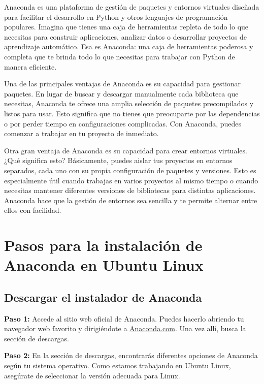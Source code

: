 \documentclass[
  a4paper,
]{article}
\begin{document}
Anaconda es una plataforma de gestión de paquetes y entornos virtuales
diseñada para facilitar el desarrollo en Python y otros lenguajes de
programación populares. Imagina que tienes una caja de herramientas
repleta de todo lo que necesitas para construir aplicaciones, analizar
datos o desarrollar proyectos de aprendizaje automático. Esa es
Anaconda: una caja de herramientas poderosa y completa que te brinda
todo lo que necesitas para trabajar con Python de manera eficiente.

Una de las principales ventajas de Anaconda es su capacidad para
gestionar paquetes. En lugar de buscar y descargar manualmente cada
biblioteca que necesitas, Anaconda te ofrece una amplia selección de
paquetes precompilados y listos para usar. Esto significa que no tienes
que preocuparte por las dependencias o por perder tiempo en
configuraciones complicadas. Con Anaconda, puedes comenzar a trabajar en
tu proyecto de inmediato.

Otra gran ventaja de Anaconda es su capacidad para crear entornos
virtuales. ¿Qué significa esto? Básicamente, puedes aislar tus proyectos
en entornos separados, cada uno con su propia configuración de paquetes
y versiones. Esto es especialmente útil cuando trabajas en varios
proyectos al mismo tiempo o cuando necesitas mantener diferentes
versiones de bibliotecas para distintas aplicaciones. Anaconda hace que
la gestión de entornos sea sencilla y te permite alternar entre ellos
con facilidad.

\hypertarget{pasos-para-la-instalaciuxf3n-de-anaconda-en-ubuntu-linux}{%
\section{Pasos para la instalación de Anaconda en Ubuntu
Linux}\label{pasos-para-la-instalaciuxf3n-de-anaconda-en-ubuntu-linux}}

\hypertarget{descargar-el-instalador-de-anaconda}{%
\subsection{Descargar el instalador de
Anaconda}\label{descargar-el-instalador-de-anaconda}}

\textbf{Paso 1:} Accede al sitio web oficial de Anaconda. Puedes hacerlo
abriendo tu navegador web favorito y dirigiéndote a
\href{https://www.anaconda.com/}{Anaconda.com}. Una vez allí, busca la
sección de descargas.

\textbf{Paso 2:} En la sección de descargas, encontrarás diferentes
opciones de Anaconda según tu sistema operativo. Como estamos trabajando
en Ubuntu Linux, asegúrate de seleccionar la versión adecuada para
Linux.
\end{document}
